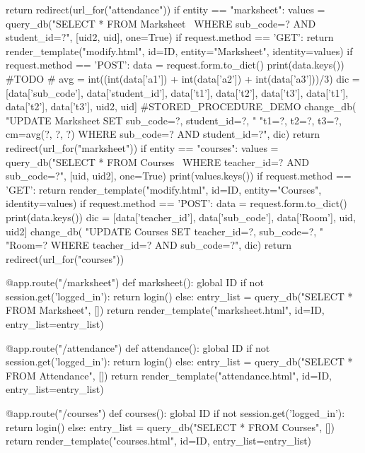 \begin{python}
            return redirect(url_for("attendance"))
    if entity == "marksheet":
        values = query_db("SELECT * FROM Marksheet \
                            WHERE sub_code=? AND student_id=?",
                          [uid2, uid], one=True)
        if request.method == 'GET':
            return render_template("modify.html", id=ID,
                                   entity="Marksheet", identity=values)
        if request.method == 'POST':
            data = request.form.to_dict()
            print(data.keys())
            #TODO
            # avg = int((int(data['a1']) + int(data['a2']) + int(data['a3']))/3)
            dic = [data['sub_code'], data['student_id'],
                    data['t1'], data['t2'], data['t3'],
                   data['t1'], data['t2'], data['t3'], uid2, uid]
            #STORED_PROCEDURE_DEMO
            change_db(
                "UPDATE Marksheet SET sub_code=?, student_id=?,  "
                "t1=?, t2=?, t3=?, cm=avg(?, ?, ?) WHERE sub_code=? AND student_id=?", dic)
            return redirect(url_for("marksheet"))
    if entity == "courses":
        values = query_db("SELECT * FROM Courses \
                            WHERE teacher_id=? AND sub_code=?",
                          [uid, uid2], one=True)
        print(values.keys())
        if request.method == 'GET':
            return render_template("modify.html", id=ID,
                                   entity="Courses", identity=values)
        if request.method == 'POST':
            data = request.form.to_dict()
            print(data.keys())
            dic = [data['teacher_id'], data['sub_code'],
                    data['Room'], uid, uid2]
            change_db(
                "UPDATE Courses SET teacher_id=?,  sub_code=?, "
                "Room=? WHERE teacher_id=? AND sub_code=?", dic)
            return redirect(url_for("courses"))


@app.route("/marksheet")
def marksheet():
    global ID
    if not session.get('logged_in'):
        return login()
    else:
        entry_list = query_db("SELECT * FROM Marksheet", [])
        return render_template("marksheet.html",  id=ID,
                               entry_list=entry_list)

@app.route("/attendance")
def attendance():
    global ID
    if not session.get('logged_in'):
        return login()
    else:
        entry_list = query_db("SELECT * FROM Attendance", [])
        return render_template("attendance.html",  id=ID,
                               entry_list=entry_list)

@app.route("/courses")
def courses():
    global ID
    if not session.get('logged_in'):
        return login()
    else:
        entry_list = query_db("SELECT * FROM Courses", [])
        return render_template("courses.html", id=ID,
                               entry_list=entry_list)


\end{python}
